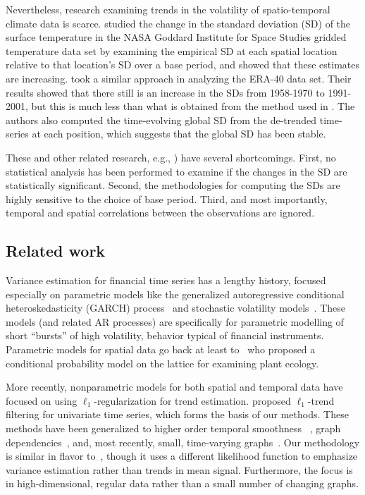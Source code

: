 \documentclass{article}
\begin{document}
Nevertheless, research examining trends in the volatility of
spatio-temporal climate data is scarce. \citep{hansen_perception_2012} studied the change in
the standard deviation (SD) of the surface temperature in the NASA
Goddard Institute for Space Studies gridded temperature data set by
examining the empirical SD at each spatial location relative to that
location's SD over a base period, and showed
that these estimates are increasing.
\citep{huntingford_no_2013} took a similar
approach in analyzing the ERA-40 data set. Their results showed that there
still is an increase in the SDs from 1958-1970 to 1991-2001, but this
is much less than what is obtained from the method used in
\citep{hansen_perception_2012}. The authors also computed the
time-evolving global SD from the de-trended time-series at each
position, which suggests that the global SD has been
stable. 

These and other related research, e.g.,
\citep{rhines_frequent_2013}) have several shortcomings. First, no
statistical analysis has been performed to examine if the changes in
the SD are statistically significant. Second, the methodologies for
computing the SDs are highly sensitive to the choice of base period. Third,
and most importantly, temporal and spatial correlations between the
observations are ignored.  


\subsection{Related work}

Variance estimation for financial time series has a lengthy history,
focused especially on parametric models like the generalized
autoregressive conditional heteroskedasticity (GARCH) process~\citep{engle2002dynamic} and
stochastic volatility models~\citep{HarveyRuiz1994}. These models (and
related AR processes) are specifically for parametric modelling of
short ``bursts'' of high volatility, behavior typical of financial
instruments. Parametric models for spatial data go back at least
to~\citep{besag1974spatial} who proposed a conditional probability
model on the lattice for examining plant ecology.

More recently, nonparametric models for both spatial and temporal data
have focused on using $\ell_1$-regularization for trend
estimation. \citep{KimKoh2009} proposed $\ell_1$-trend filtering for
univariate time series, which forms the basis of our methods. These
methods have been generalized to higher order temporal smoothness
~\citep{Tibshirani2014}, graph dependencies~\citep{WangSharpnack2016},
and, most recently, small, time-varying
graphs~\citep{HallacPark2017}. Our methodology is similar in flavor
to~\citep{HallacPark2017}, though it uses a different likelihood
function to emphasize variance estimation rather than trends in mean
signal. Furthermore, the focus is in high-dimensional, regular data
rather than a small number of changing graphs.
\end{document}
